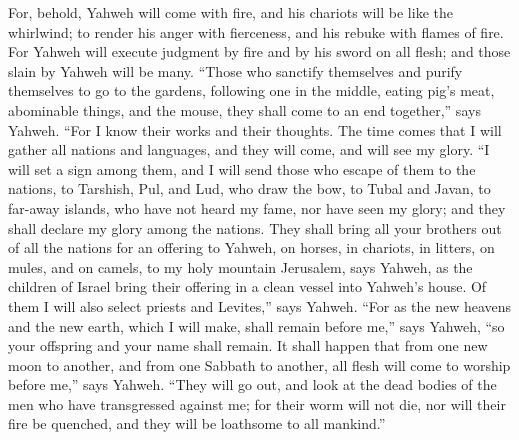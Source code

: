  For, behold, Yahweh will come with fire, and his
chariots will be like the whirlwind; to render his anger with
fierceness, and his rebuke with flames of fire.  For
Yahweh will execute judgment by fire and by his sword on all flesh; and
those slain by Yahweh will be many.  ``Those who sanctify
themselves and purify themselves to go to the gardens, following one in
the middle, eating pig's meat, abominable things, and the mouse, they
shall come to an end together,'' says Yahweh.  ``For I
know their works and their thoughts. The time comes that I will gather
all nations and languages, and they will come, and will see my glory.
 ``I will set a sign among them, and I will send those
who escape of them to the nations, to Tarshish, Pul, and Lud, who draw
the bow, to Tubal and Javan, to far-away islands, who have not heard my
fame, nor have seen my glory; and they shall declare my glory among the
nations.  They shall bring all your brothers out of all
the nations for an offering to Yahweh, on horses, in chariots, in
litters, on mules, and on camels, to my holy mountain Jerusalem, says
Yahweh, as the children of Israel bring their offering in a clean vessel
into Yahweh's house.  Of them I will also select priests
and Levites,'' says Yahweh.  ``For as the new heavens and
the new earth, which I will make, shall remain before me,'' says Yahweh,
``so your offspring and your name shall remain.  It shall
happen that from one new moon to another, and from one Sabbath to
another, all flesh will come to worship before me,'' says Yahweh.
 ``They will go out, and look at the dead bodies of the
men who have transgressed against me; for their worm will not die, nor
will their fire be quenched, and they will be loathsome to all
mankind.''

